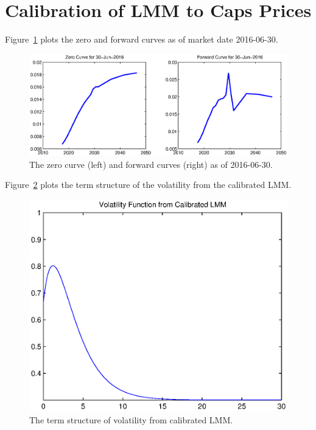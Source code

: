\section{Calibration of LMM to Caps Prices}


Figure~\ref{fig::curves} plots the zero and forward curves as of market date 2016-06-30. 

\begin{center}
  \begin{figure}
      \includegraphics[scale=0.6]{zero_forward_curves.eps}
      \caption{The zero curve (left) and forward curves (right) as of 2016-06-30.}\label{fig::curves}
  \end{figure}
\end{center}


Figure~\ref{fig::vol_term} plots the term structure of the volatility from the calibrated LMM.

\begin{center}
  \begin{figure}
      \includegraphics[scale=0.6]{vol_func.eps}
      \caption{The term structure of volatility from calibrated LMM.}\label{fig::vol_term}
  \end{figure}
\end{center}


